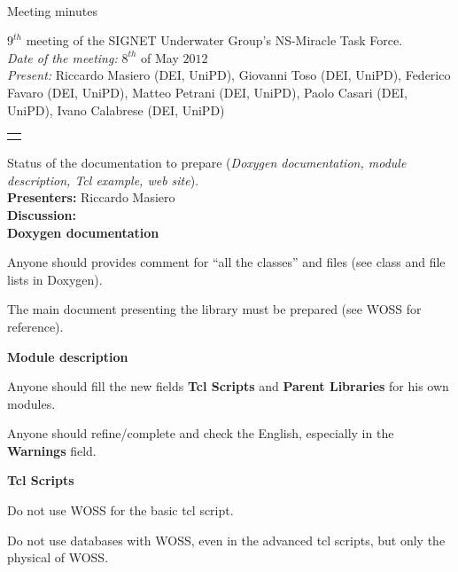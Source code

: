 \documentclass[11pt,journal,draftclsnofoot,onecolumn,twoside,letterpaper]{IEEEtran}
\theoremstyle{definition} \newtheorem{definition}[]{Definition}
\theoremstyle{theorem} \newtheorem{theorem}[]{Theorem}
\begin{document}
\pagestyle{empty}

\begin{Large} \\ \end{Large}
\begin{large} {Meeting minutes} \end{large}

\vspace{0.8cm}

 $9^{th}$ meeting of the SIGNET Underwater Group's NS-Miracle Task Force.\\
{\it Date of the meeting: } $8^{th}$ of May $2012$\\
{\it Present: } Riccardo Masiero (DEI, UniPD), Giovanni Toso (DEI, UniPD), Federico Favaro (DEI, UniPD), Matteo Petrani (DEI, UniPD), Paolo Casari (DEI, UniPD), Ivano Calabrese (DEI, UniPD)\\

\vspace{0.5cm}

\begin{tabular}{p{}}
 \hline \\
\end{tabular}


 Status of the documentation to prepare ({\it Doxygen documentation, module description, Tcl example, web site}).\\
{\bf Presenters:} Riccardo Masiero\\
{\bf Discussion:}\\

{\bf Doxygen documentation}

Anyone should provides comment for ``all the classes'' and files (see class and file lists in Doxygen).

The main document presenting the library must be prepared (see WOSS for reference).


{\bf Module description}

Anyone should fill the new fields {\bf Tcl Scripts} and {\bf Parent Libraries} for his  own modules.

Anyone should refine/complete and check the English, especially in the {\bf Warnings} field.


{\bf Tcl Scripts}

Do not use WOSS for the basic tcl script.

Do not use databases with WOSS, even in the advanced tcl scripts, but only the physical of WOSS.
\end{document}
